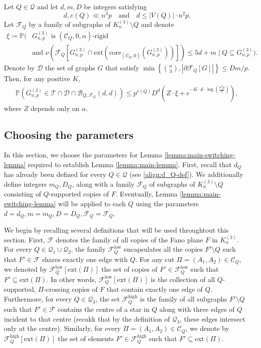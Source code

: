 \documentclass[11pt,a4paper,oneside,reqno]{amsart}
\newcommand{\Gnp}{G_{n, p}^{(3)}}
\newcommand{\cB}{\mathcal{B}}
\newcommand{\cC}{\mathcal{C}}
\newcommand{\cD}{\mathcal{D}}
\newcommand{\cF}{\mathcal{F}}
\newcommand{\cQ}{\mathcal{Q}}
\newcommand{\cT}{\mathcal{T}}
\renewcommand{\Pr}{\mathbb{P}}
\newcommand{\1}{\mathbbm{1}} %
\renewcommand{\le}{\leqslant}
\newcommand{\cFQL}{\cF_Q^{\mathrm{low}}}
\newcommand{\cFQH}{\cF_Q^{\mathrm{high}}}
\newcommand{\ext}{\mathrm{ext}}
\newcommand{\core}{\mathrm{core}}
\begin{document}
\begin{lemma}\label{lemma:main-switching-lemma}
    Let $Q \in \cQ$ and let $d, m, D$ be integers satisfying
    \[
        d, e(Q) \ll n^3 p \quad \text{and} \quad d \le |V(Q)| \cdot n^2 p.
    \]
    Let $\cF_Q$ by a family of subgraphs of $K_n^{(3)} \setminus Q$ and denote     
    \begin{align*}
        \xi \coloneqq \Pr\Bigg( &\Gnp \text{ is $(\cC_Q, 0, \alpha)$-rigid} \\
        &\text{and } \nu\left(\cF_Q\left[\Gnp \cap \ext\left(\core_{(\cC_Q, 0)}\left(\Gnp\right)\right)\right]\right) \le 5d + m \;\Bigg|\; Q \subseteq \Gnp\Bigg).
    \end{align*}  
    Denote by $\cD$ the set of graphs $G$ that satisfy $\min\left\{\binom{n}{3}, \left|\partial\cF_Q\left[G\right]\right|\right\} \le Dm/p$. Then, for any positive $K$, 
    \begin{align*}
        \Pr\left(\Gnp \in \cT \cap \cD \cap \cB_{Q, \cF_Q}(d, d) \right) \le p^{e(Q)} D^{d} \left(Z \cdot \xi + e^{-K \cdot d \cdot \log\left(\frac{n^3 p}{d}\right)}\right),
    \end{align*}
    where $Z$ depends only on $\alpha$.
\end{lemma}

\subsection{Choosing the parameters}\label{section:choosing-parameters-for-swithcing-lemma}
In this section, we choose the parameters for Lemma \ref{lemma:main-switching-lemma} required to establish Lemma \ref{lemma:main-lemma}. First, recall that $d_Q$ has already been defined for every $Q \in \cQ$ (see \eqref{align:d_Q-def}). We additionally define integers $m_Q, D_Q$, along with a family $\cF_Q$ of subgraphs of $K_n^{(3)} \setminus Q$ consisting of $Q$-supported copies of $F$. Eventually, Lemma \ref{lemma:main-switching-lemma} will be applied to each $Q$ using the parameters $d = d_Q, m = m_Q, D = D_Q, \cF_Q = \cF_Q$.

We begin by recalling several definitions that will be used throughtout this section. First, $\cF$ denotes the family of all copies of the Fano plane $F$ in $K_n^{(3)}$. For every $Q \in \cQ_1 \cup \cQ_2$, the family $\cFQL$ encapsulates all the copies $F' \setminus Q$ such that $F' \in \cF$ shares exactly one edge with $Q$. For any cut $\Pi = (A_1, A_2) \in \cC_Q$, we denoted by $\cFQL[\ext(\Pi)]$ the set of copies of $F' \in \cFQL$ such that $F' \subseteq \ext(\Pi)$. In other words, $\cFQL[\ext(\Pi)]$ is the collection of all $Q$-supported, $\Pi$-crossing copies of $F$ that contain exactly one edge of $Q$. 
Furthermore, for every $Q \in \cQ_3$, the set $\cFQH$ is the family of all subgraphs $F' \setminus Q$ such that $F' \in \cF$ contains the centre of a star in $Q$ along with three edges of $Q$ incident to that centre (recakk that by the definition of $\cQ_3$, these edges intersect only at the centre). Similarly, for every $\Pi = (A_1, A_2) \in \cC_Q$, we denote by $\cFQH[\ext(\Pi)]$ the set of elements $F' \in \cFQH$ such that $F' \subseteq \ext(\Pi)$.
\end{document}
